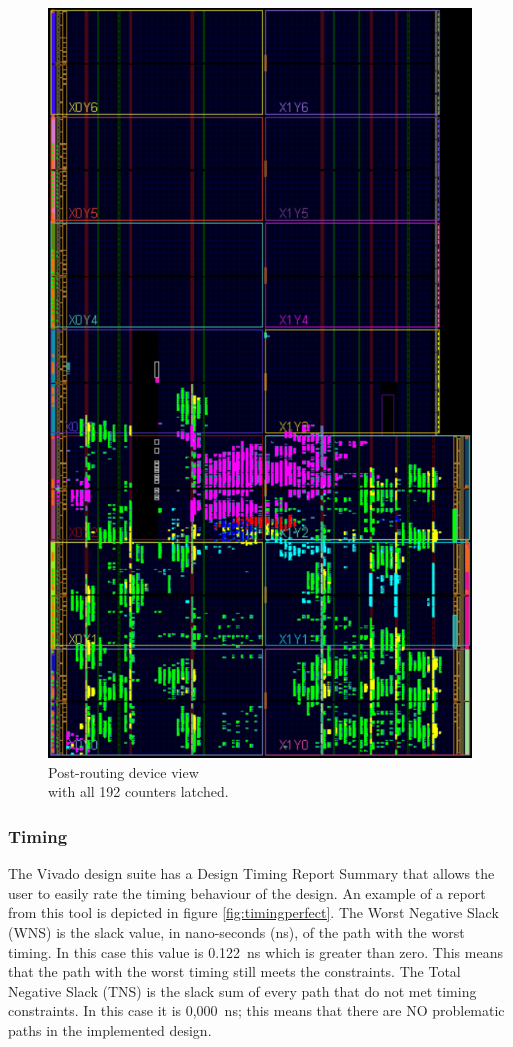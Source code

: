 \begin{figure}[H]
\begin{minipage}{.5\textwidth}
		\includegraphics[width=.85\linewidth]{IMG/ch4/routed_colored_perfect}
		\caption{Post-routing device view\\ with all 192 counters latched.}
		\label{fig:allcounters}
	\end{minipage}
\end{figure}
\subsubsection{Timing}
\noindent The Vivado design suite has a Design Timing Report Summary that allows the user to easily rate the timing behaviour of the design.
An example of a report from this tool is depicted in figure \ref{fig:timingperfect}.
The Worst Negative Slack (WNS) is the slack value, in nano-seconds (ns), of the path with the worst timing. In this case this value is 0.122~ns which is greater than zero. This means that the path with the worst timing still meets the constraints.
The Total Negative Slack (TNS) is the slack sum of every path that do not met timing constraints. In this case it is 0,000~ns; this means that there are NO problematic paths in the implemented design.

